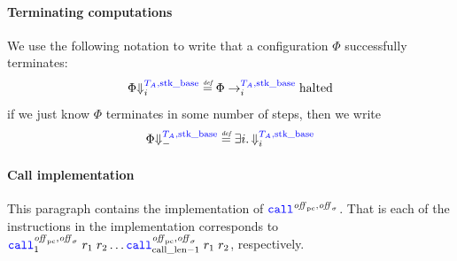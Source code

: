 \documentclass[a4paper]{article}
\begin{document}

\paragraph{Terminating computations}
We use the following notation to write that a configuration $\Phi$ successfully terminates:
\[
  \Phi\sterm[i]{\src{\ta,\stkb}} \defeq \Phi \nstep[i]{\src{\ta,\stkb}} \halted
\]
if we just know $\Phi$ terminates in some number of steps, then we write
\[
  \Phi\sterm{\src{\ta,\stkb}} \defeq \exists i \ldotp \sterm[i]{\src{\ta,\stkb}}
\]

\paragraph{Call implementation}
\label{par:call-impl}
This paragraph contains the implementation of $\scall{\offpc,\offsigma}{}{}$. That is each of the instructions in the implementation corresponds to $\scall[1]{\offpc,\offsigma}{r_1}{r_2} \dots \scall[\calllen-1]{\offpc,\offsigma}{r_1}{r_2}$, respectively.
\end{document}

